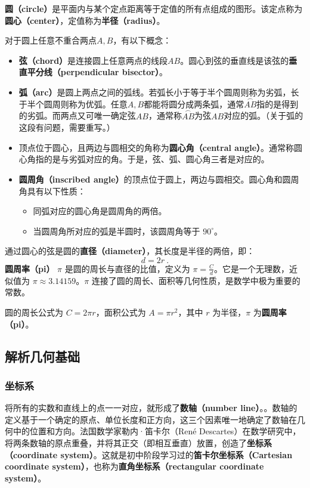\textbf{圆（circle）}是平面内与某个定点距离等于定值的所有点组成的图形。该定点称为\textbf{圆心（center）}，定值称为\textbf{半径（radius）}。

对于圆上任意不重合两点$A,B$，有以下概念：
\begin{itemize}
\item \textbf{弦（chord）}是连接圆上任意两点的线段$AB$。圆心到弦的垂直线是该弦的\textbf{垂直平分线（perpendicular bisector）}。
\item \textbf{弧（arc）}是圆上两点之间的弧线。若弧长小于等于半个圆周则称为劣弧，长于半个圆周则称为优弧。任意$A,B$都能将圆分成两条弧，通常$\overset{\frown} {AB}$指的是得到的劣弧。而两点又可唯一确定弦$AB$，通常称$\overset{\frown} {AB}$为弦$AB$对应的弧。（关于弧的这段有问题，需要重写。）
\item 顶点位于圆心，且两边与圆相交的角称为\textbf{圆心角（central angle）}。通常称圆心角指的是与劣弧对应的角。于是，弦、弧、圆心角三者是对应的。
\item \textbf{圆周角（inscribed angle）}的顶点位于圆上，两边与圆相交。圆心角和圆周角具有以下性质：
    \begin{itemize}
        \item 同弧对应的圆心角是圆周角的两倍。
        \item 当圆周角所对应的弧是半圆时，该圆周角等于 $90^\circ$。
    \end{itemize}
\end{itemize}
通过圆心的弦是圆的\textbf{直径（diameter）}，其长度是半径的两倍，即：
\begin{equation}
d = 2r~.
\end{equation}
\textbf{圆周率（pi）} $\pi$ 是圆的周长与直径的比值，定义为 $\pi = \frac{C}{d}$。它是一个无理数，近似值为 $\pi \approx 3.14159$。$\pi$ 连接了圆的周长、面积等几何性质，是数学中极为重要的常数。

圆的周长公式为 $C = 2\pi r$，面积公式为 $A = \pi r^2$，其中 $r$ 为半径，$\pi$ 为\textbf{圆周率（pi）}。

\subsection{解析几何基础}

\subsubsection{坐标系}
将所有的实数和直线上的点一一对应，就形成了\textbf{数轴（number line）}。。数轴的定义基于一个确定的原点、单位长度和正方向，这三个因素唯一地确定了数轴在几何中的位置和方向。法国数学家勒内·笛卡尔（René Descartes）在数学研究中，将两条数轴的原点重叠，并将其正交（即相互垂直）放置，创造了\textbf{坐标系（coordinate system）}。这就是初中阶段学习过的\textbf{笛卡尔坐标系（Cartesian coordinate system）}，也称为\textbf{直角坐标系（rectangular coordinate system）}。

